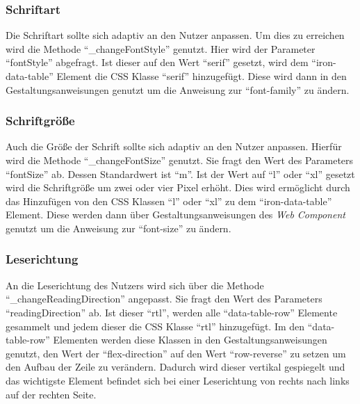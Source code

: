 \documentclass[12pt, paper=a4, bibtotoc, toc=listof, headsepline=true]{scrreprt}
\begin{document}
	\subsubsection{Schriftart}
	Die Schriftart sollte sich adaptiv an den Nutzer anpassen. Um dies zu erreichen wird die Methode \enquote{\_changeFontStyle} genutzt. Hier wird der Parameter \enquote{fontStyle} abgefragt. Ist dieser auf den Wert \enquote{serif} gesetzt, wird dem \enquote{iron-data-table} Element die CSS Klasse \enquote{serif} hinzugefügt. Diese wird dann in den Gestaltungsanweisungen genutzt um die Anweisung zur \enquote{font-family} zu ändern.
	\subsubsection{Schriftgröße}
	Auch die Größe der Schrift sollte sich adaptiv an den Nutzer anpassen. Hierfür wird die Methode \enquote{\_changeFontSize} genutzt. Sie fragt den Wert des Parameters \enquote{fontSize} ab. Dessen Standardwert ist \enquote{m}. Ist der Wert auf \enquote{l} oder \enquote{xl} gesetzt wird die Schriftgröße um zwei oder vier Pixel erhöht. Dies wird ermöglicht durch das Hinzufügen von den CSS Klassen \enquote{l} oder \enquote{xl} zu dem \enquote{iron-data-table} Element. Diese werden dann über Gestaltungsanweisungen des \emph{Web Component} genutzt um die Anweisung zur \enquote{font-size} zu ändern.
	\subsubsection{Leserichtung}
	An die Leserichtung des Nutzers wird sich über die Methode \enquote{\_changeReadingDirection} angepasst. Sie fragt den Wert des Parameters \enquote{readingDirection} ab. Ist dieser \enquote{rtl}, werden alle \enquote{data-table-row} Elemente gesammelt und jedem dieser die CSS Klasse \enquote{rtl} hinzugefügt. Im den \enquote{data-table-row} Elementen werden diese Klassen in den Gestaltungsanweisungen genutzt, den Wert der \enquote{flex-direction} auf den Wert \enquote{row-reverse} zu setzen um den Aufbau der Zeile zu verändern. Dadurch wird dieser vertikal gespiegelt und das wichtigste Element befindet sich bei einer Leserichtung von rechts nach links auf der rechten Seite.	
\end{document}
